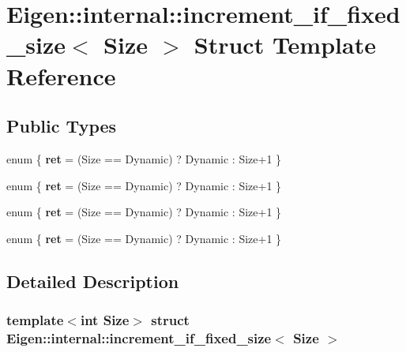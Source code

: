 \hypertarget{struct_eigen_1_1internal_1_1increment__if__fixed__size}{}\section{Eigen\+:\+:internal\+:\+:increment\+\_\+if\+\_\+fixed\+\_\+size$<$ Size $>$ Struct Template Reference}
\label{struct_eigen_1_1internal_1_1increment__if__fixed__size}
\subsection*{Public Types}
\begin{DoxyCompactItemize}
\item 
\mbox{\label{struct_eigen_1_1internal_1_1increment__if__fixed__size_a4de9f0ccdb27d17eb130ecfcac3cabc6}} 
enum \{ {\bfseries ret} = (Size == Dynamic) ? Dynamic \+: Size+1
 \}
\item 
\mbox{\label{struct_eigen_1_1internal_1_1increment__if__fixed__size_ad1f2b9bb2605ff61a9d1366f2afef05b}} 
enum \{ {\bfseries ret} = (Size == Dynamic) ? Dynamic \+: Size+1
 \}
\item 
\mbox{\label{struct_eigen_1_1internal_1_1increment__if__fixed__size_a81a06363c8b28fb7badf6c7babaf4e31}} 
enum \{ {\bfseries ret} = (Size == Dynamic) ? Dynamic \+: Size+1
 \}
\item 
\mbox{\label{struct_eigen_1_1internal_1_1increment__if__fixed__size_aef109dee4a3e95ca3cdf06ffe00a566d}} 
enum \{ {\bfseries ret} = (Size == Dynamic) ? Dynamic \+: Size+1
 \}
\end{DoxyCompactItemize}


\subsection{Detailed Description}
\subsubsection*{template$<$int Size$>$\newline
struct Eigen\+::internal\+::increment\+\_\+if\+\_\+fixed\+\_\+size$<$ Size $>$}



